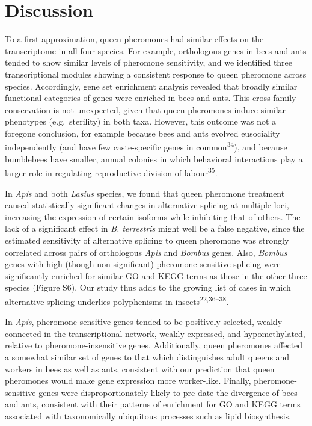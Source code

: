 \documentclass[12pt,]{article}
\begin{document}
\section{Discussion}\label{discussion}

To a first approximation, queen pheromones had similar effects on the
transcriptome in all four species. For example, orthologous genes in
bees and ants tended to show similar levels of pheromone sensitivity,
and we identified three transcriptional modules showing a consistent
response to queen pheromone across species. Accordingly, gene set
enrichment analysis revealed that broadly similar functional categories
of genes were enriched in bees and ants. This cross-family conservation
is not unexpected, given that queen pheromones induce similar phenotypes
(e.g.~sterility) in both taxa. However, this outcome was not a foregone
conclusion, for example because bees and ants evolved eusociality
independently (and have few caste-specific genes in
common\textsuperscript{34}), and because bumblebees have smaller, annual
colonies in which behavioral interactions play a larger role in
regulating reproductive division of labour\textsuperscript{35}.

In \emph{Apis} and both \emph{Lasius} species, we found that queen
pheromone treatment caused statistically significant changes in
alternative splicing at multiple loci, increasing the expression of
certain isoforms while inhibiting that of others. The lack of a
significant effect in \emph{B. terrestris} might well be a false
negative, since the estimated sensitivity of alternative splicing to
queen pheromone was strongly correlated across pairs of orthologous
\emph{Apis} and \emph{Bombus} genes. Also, \emph{Bombus} genes with high
(though non-significant) pheromone-sensitive splicing were significantly
enriched for similar GO and KEGG terms as those in the other three
species (Figure S6). Our study thus adds to the growing list of cases in
which alternative splicing underlies polyphenisms in
insects\textsuperscript{22,36--38}.

In \emph{Apis}, pheromone-sensitive genes tended to be positively
selected, weakly connected in the transcriptional network, weakly
expressed, and hypomethylated, relative to pheromone-insensitive genes.
Additionally, queen pheromones affected a somewhat similar set of genes
to that which distinguishes adult queens and workers in bees as well as
ants, consistent with our prediction that queen pheromones would make
gene expression more worker-like. Finally, pheromone-sensitive genes
were disproportionately likely to pre-date the divergence of bees and
ants, consistent with their patterns of enrichment for GO and KEGG terms
associated with taxonomically ubiquitous processes such as lipid
biosynthesis.
\end{document}
